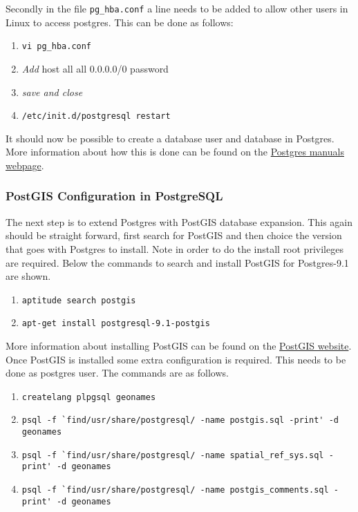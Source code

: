 \noindent Secondly in the file \lstinline|pg_hba.conf| a line needs to be added to allow other users in Linux to access postgres. This can be done as follows:

\begin{enumerate}[resume]
	\item \lstinline|vi pg_hba.conf|
	\item \textit{Add} host all	all 0.0.0.0/0 password
	\item \textit{save and close}
	\item \lstinline|/etc/init.d/postgresql restart|
\end{enumerate}

\noindent It should now be possible to create a database user and database in Postgres. More information about how this is done can be found on the \href{http://www.postgresql.org/docs/manuals/}{Postgres manuals webpage}.

\subsubsection{PostGIS Configuration in PostgreSQL}
\label{sec:postgis}
The next step is to extend Postgres with PostGIS database expansion. This again should be straight forward, first search for PostGIS and then choice the version that goes with Postgres to install. Note in order to do the install root privileges are required. Below the commands to search and install PostGIS for Postgres-9.1 are shown.

\begin{enumerate}
	\item \lstinline|aptitude search postgis|
	\item \lstinline|apt-get install postgresql-9.1-postgis|
\end{enumerate} 

\noindent More information about installing PostGIS  can be found on the \href{http://www.postgis.net/install}{PostGIS website}.
\newline
\newline
Once PostGIS is installed some extra configuration is required. This needs to be done as postgres user. The commands are as follows.

\begin{enumerate}	
	\item \lstinline|createlang plpgsql geonames|
	\item \lstinline|psql -f `find/usr/share/postgresql/ -name postgis.sql -print' -d geonames|
	\item \lstinline|psql -f `find/usr/share/postgresql/ -name spatial_ref_sys.sql -print' -d geonames|
	\item \lstinline|psql -f `find/usr/share/postgresql/ -name postgis_comments.sql -print' -d geonames|
\end{enumerate}

